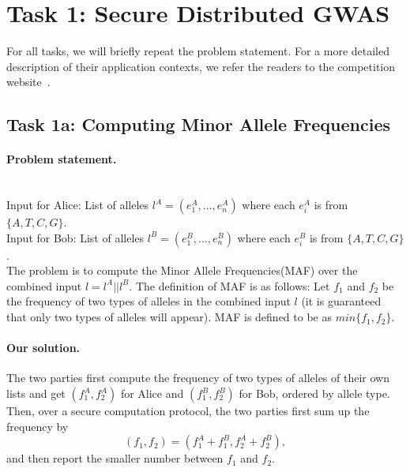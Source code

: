 \section{Task 1: Secure Distributed GWAS}
For all tasks, we will briefly 
repeat the problem statement.
For a more detailed description of their application
contexts, we refer the readers to the
competition website~\cite{idash}.

\subsection*{Task 1a: Computing Minor Allele Frequencies}
\paragraph{Problem statement.}
~\\
Input for Alice: List of alleles $l^A = (e^A_1,...,e^A_n)$ 
where each $e^A_i$ is from $\{A, T, C, G\}$.\\
Input for Bob: List of alleles $l^B = (e^B_1,...,e^B_n)$
where each $e^B_i$ is from $\{A, T, C, G\}$.\\

The problem is to compute the 
Minor Allele Frequencies(MAF) over 
the combined input $l = l^A || l^B$. 
The definition of MAF is as follows:
Let $f_1$ and $f_2$ be the frequency of two types of alleles in the
combined input $l$ (it is guaranteed
that only two types of alleles will appear). 
MAF is defined to be as $min\{f_1, f_2\}$.

\paragraph{Our solution.}
The two parties first compute the frequency of two types of alleles of their own lists and get
$(f^A_1, f^A_2)$ for Alice and $(f^B_1,f^B_2)$ for Bob, ordered by allele type.
Then, over a secure computation protocol, 
the two parties first sum up the frequency by
$$(f_1, f_2) = (f^A_1+f^B_1, f^A_2+f^B_2),$$
and then report the smaller number between $f_1$ and $f_2$.

